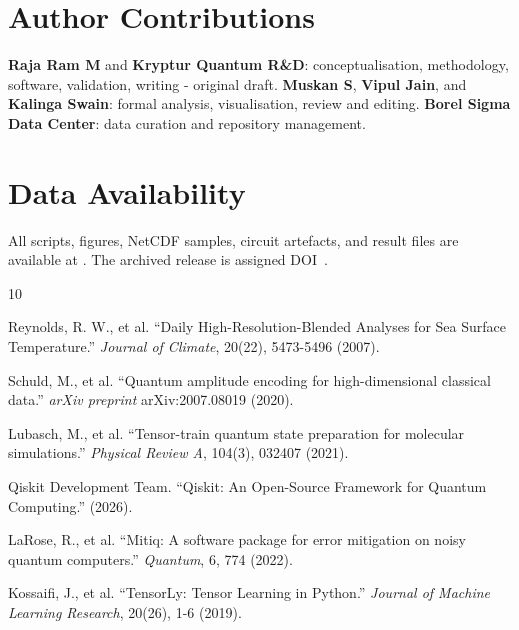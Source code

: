 \documentclass[12pt,a4paper]{article}
\newcommand{\iconlink}[2]{%
  \href{#1}{\raisebox{-0.12ex}{\tikz[baseline=-0.5ex]{\node[draw=gray!60, rounded corners=1pt,
    inner sep=1.5pt, minimum height=0.55cm, minimum width=0.55cm, fill=gray!5] {#2};}}}%
}
\newcommand{\githublink}{\iconlink{https://github.com/BorelSigmaInc/Quantum-Olfacto-Vibration}{GH}}
\newcommand{\zenodolink}{\iconlink{https://doi.org/10.5281/zenodo.20736570}{ZN}}
\begin{document}
\section*{Author Contributions}
\textbf{Raja Ram M} and \textbf{Kryptur Quantum R\&D}: conceptualisation, methodology, software, validation, writing - original draft. \textbf{Muskan S}, \textbf{Vipul Jain}, and \textbf{Kalinga Swain}: formal analysis, visualisation, review and editing. \textbf{Borel Sigma Data Center}: data curation and repository management.

\section*{Data Availability}
All scripts, figures, NetCDF samples, circuit artefacts, and result files are available at \githublink. The archived release is assigned DOI \zenodolink\,.


\begin{thebibliography}{10}

Reynolds, R. W., et al. ``Daily High-Resolution-Blended Analyses for Sea Surface Temperature.'' \textit{Journal of Climate}, 20(22), 5473-5496 (2007). 

Schuld, M., et al. ``Quantum amplitude encoding for high-dimensional classical data.'' \textit{arXiv preprint} arXiv:2007.08019 (2020).

Lubasch, M., et al. ``Tensor-train quantum state preparation for molecular simulations.'' \textit{Physical Review A}, 104(3), 032407 (2021). 

Qiskit Development Team. ``Qiskit: An Open-Source Framework for Quantum Computing.'' (2026).

LaRose, R., et al. ``Mitiq: A software package for error mitigation on noisy quantum computers.'' \textit{Quantum}, 6, 774 (2022). 

Kossaifi, J., et al. ``TensorLy: Tensor Learning in Python.'' \textit{Journal of Machine Learning Research}, 20(26), 1-6 (2019).

\end{thebibliography}
\end{document}
